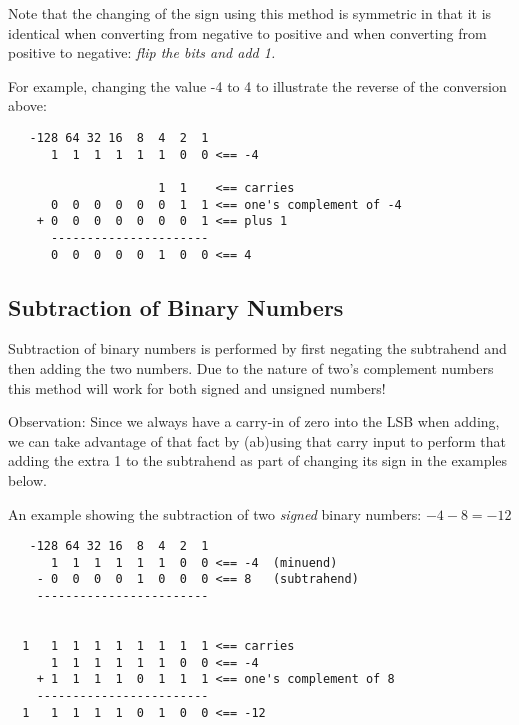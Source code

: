 Note that the changing of the sign using this method is symmetric
in that it is identical when converting from negative to positive
and when converting from positive to negative: {\em flip the bits and
add 1.}

For example, changing the value -4 to 4 to illustrate the
reverse of the conversion above:

\begin{verbatim}
   -128 64 32 16  8  4  2  1
      1  1  1  1  1  1  0  0 <== -4

                     1  1    <== carries
      0  0  0  0  0  0  1  1 <== one's complement of -4
    + 0  0  0  0  0  0  0  1 <== plus 1
      ----------------------
      0  0  0  0  0  1  0  0 <== 4
\end{verbatim}

\subsection{Subtraction of Binary Numbers}


Subtraction%
of binary numbers is performed by first negating
the subtrahend and then adding the two numbers.  Due to the
nature of two's complement numbers this method will work for both 
signed and unsigned numbers!

Observation: Since we always have a carry-in of zero into the LSB when
adding, we can take advantage of that fact by (ab)using that carry input
to perform that adding the extra 1 to the subtrahend as part of
changing its sign in the examples below. 

An example showing the subtraction of two {\em signed} binary numbers: $-4-8 = -12$

\begin{verbatim}
   -128 64 32 16  8  4  2  1
      1  1  1  1  1  1  0  0 <== -4  (minuend)
    - 0  0  0  0  1  0  0  0 <== 8   (subtrahend)
    ------------------------


  1   1  1  1  1  1  1  1  1 <== carries
      1  1  1  1  1  1  0  0 <== -4
    + 1  1  1  1  0  1  1  1 <== one's complement of 8
    ------------------------
  1   1  1  1  1  0  1  0  0 <== -12
\end{verbatim}


